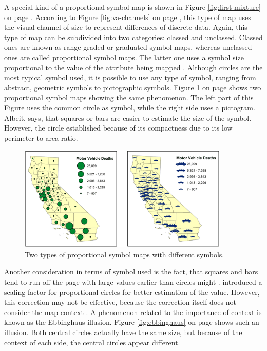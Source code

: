 A special kind of a proportional symbol map is shown in Figure \ref{fig:first-mixture} on page \pageref{fig:first-mixture}. According to Figure \ref{fig:va-channels} on page \pageref{fig:va-channels}, this type of map uses the visual channel of size to represent differences of discrete data. Again, this type of map can be subdivided into two categories: classed and unclassed. Classed ones are known as range-graded or graduated symbol maps, whereas unclassed ones are called proportional symbol maps. The latter one uses a symbol size proportional to the value of the attribute being mapped .
Although circles are the most typical symbol used, it is possible to use any type of symbol, ranging from abstract, geometric symbols to pictographic symbols. Figure \ref{fig:different-symbols} on page \pageref{fig:different-symbols} shows two proportional symbol maps showing the same phenomenon. The left part of this Figure uses the common circle as symbol, while the right side uses a pictogram. Albeit, \citeauthor{Dutton.2014} says, that squares or bars are easier to estimate the size of the symbol. However, the circle established because of its compactness due to its low perimeter to area ratio.

\begin{figure}[!htb]
\centering
\includegraphics[height=5cm,keepaspectratio]{images/psm/symbols.png}
\caption[
    Two types of proportional symbol maps with different symbols .
]{Two types of proportional symbol maps with different symbols.}
\label{fig:different-symbols}
\end{figure}

Another consideration in terms of symbol used is the fact, that squares and bars tend to run off the page with large values earlier than circles might . \citeauthor{FLANNERY1971} introduced a scaling factor for proportional circles for better estimation of the value. However, this correction may not be effective, because the correction itself does not consider the map context . A phenomenon related to the importance of context is known as the Ebbinghaus illusion. Figure \ref{fig:ebbinghaus} on page \pageref{fig:ebbinghaus} shows such an illusion. Both central circles actually have the same size, but because of the context of each side, the central circles appear different.

